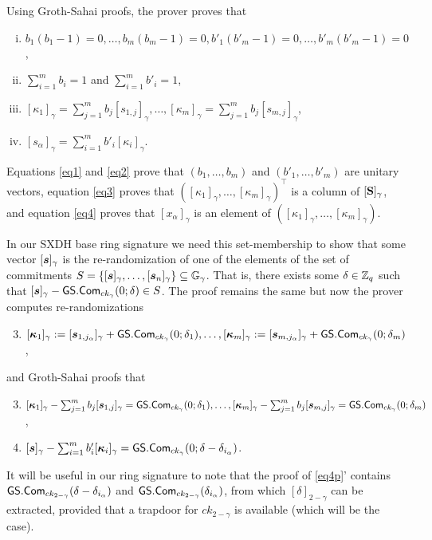 Using Groth-Sahai proofs, the prover proves that
\begin{enumerate}[i.]
\item $b_1(b_1-1)=0,\ldots,b_m(b_m-1)=0,b'_1(b'_m-1)=0,\ldots,b'_m(b'_m-1)=0$,\label{eq1}
\item $\sum_{i=1}^m b_i =1$ and $\sum_{i=1}^m b'_i=1$,\label{eq2}
\item $[\kappa_1]_\gamma=\sum_{j=1}^m b_j [s_{1,j}]_\gamma,\ldots,[\kappa_m]_\gamma=\sum_{j=1}^m b_j[s_{m,j}]_\gamma$,\label{eq3}
\item $[s_\alpha]_\gamma=\sum_{i=1}^m b'_i[\kappa_i]_\gamma$.\label{eq4}
\end{enumerate}
Equations \ref{eq1} and \ref{eq2} prove that $(b_1,\ldots,b_m)$ and $(b'_1,\ldots,b'_m)$ are unitary vectors, equation \ref{eq3} proves that $([\kappa_1]_\gamma,\ldots,[\kappa_m]_\gamma)^\top$ is a column of $[\mathbf{{S}}]_\gamma$, and equation \ref{eq4} proves that $[x_\alpha]_\gamma$ is an element of $([\kappa_1]_\gamma,\ldots,[\kappa_m]_\gamma)$.

In our SXDH base ring signature we need this set-membership to show that some vector $[{\boldsymbol{s}}]_\gamma$ is the re-randomization of one of the elements of the set of commitments $S = \{[{\boldsymbol{s}}]_\gamma,\ldots,[{\boldsymbol{s}}_n]_\gamma\}\subseteq\mathbb{G}_\gamma$. That is, there exists some $\delta\in\mathbb{Z}_q$ such that $[{\boldsymbol{s}}]_\gamma-{\mathsf{GS}}.\mathsf{Com}_{ck_\gamma}(0;\delta)\in S$. The proof remains the same but now
the prover computes re-randomizations
\begin{enumerate}[1'.]
\setcounter{enumi}{2}
\item $[{\boldsymbol{\kappa}}_1]_\gamma:=[{\boldsymbol{s}}_{1,j_\alpha}]_\gamma+{\mathsf{GS}}.\mathsf{Com}_{ck_\gamma}(0;\delta_1),\ldots,[{\boldsymbol{\kappa}}_m]_\gamma:=[{\boldsymbol{s}}_{m,j_\alpha}]_\gamma+{\mathsf{GS}}.\mathsf{Com}_{ck_\gamma}(0;\delta_m)$,
\end{enumerate}
and Groth-Sahai proofs that
\begin{enumerate}[i'.]
\setcounter{enumi}{2}
\item $[{\boldsymbol{\kappa}}_1]_\gamma - \sum_{j=1}^m b_j [{\boldsymbol{s}}_{1,j}]_\gamma = {\mathsf{GS}}.\mathsf{Com}_{ck_\gamma}(0;\delta_1),\ldots,[{\boldsymbol{\kappa}}_m]_\gamma-\sum_{j=1}^m b_j[{\boldsymbol{s}}_{m,j}]_\gamma = {\mathsf{GS}}.\mathsf{Com}_{ck_\gamma}(0;\delta_m)$,\label{eq3p}
\item $[{\boldsymbol{s}}]_\gamma - \sum_{i=1}^m b'_i[{\boldsymbol{\kappa}}_i]_\gamma  = {\mathsf{GS}}.\mathsf{Com}_{ck_\gamma}(0;\delta-\delta_{i_\alpha})$.\label{eq4p}
\end{enumerate}
It will be useful in our ring signature to note that the proof of \ref{eq4p}' contains ${\mathsf{GS}}.\mathsf{Com}_{ck_{2-\gamma}}(\delta-\delta_{i_\alpha})$ and ${\mathsf{GS}}.\mathsf{Com}_{ck_{2-\gamma}}(\delta_{i_\alpha})$, from which $[\delta]_{2-\gamma}$ can be extracted, provided that a trapdoor for $ck_{2-\gamma}$ is available (which will be the case).